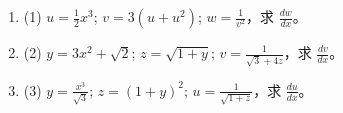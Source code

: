 \documentclass[a4paper,11pt,openany]{ltjsbook}
\begin{document}
\begin{enumerate}
\[
\begin{aligned}
\theta &= 3a^2x^{-\frac{1}{2}}; \\
\omega &= \sqrt{\frac{1-\theta}{1+\theta}}; \\
\phi &= \sqrt{3} - \frac{1}{\sqrt{2}} \omega^{-1}. \\
\end{aligned}
\]
\[
\begin{gathered}
\frac{d\theta}{dx} = -\frac{3a^2}{2\sqrt{x^3}}; \\
\frac{d\omega}{d\theta} = -\frac{1}{(1+\theta)\sqrt{1-\theta^2}}
\end{gathered}
\]
（例5参照、ページ \pageref{examples4}）；そして
\[
\frac{d\phi}{d\omega} = \frac{1}{\sqrt{2}\omega^2}.
\]

したがって \(\dfrac{d\phi}{dx} = \dfrac{1}{\sqrt{2}\,\omega^{2}} \times \dfrac{1}{(1+\theta)\sqrt{1-\theta^{2}}} \times \dfrac{3a^{2}}{2\sqrt{x^{3}}}\)。

次にまず \(\omega\)、その後 \(\theta\) をその値で置き換える。

問題集 VII

あなたは次の問題を成功裏に解くことができます。（解答はページ \pageref[page]{AnsEx:VII} を参照してください。）

\item (1) \( u = \frac{1}{2}x^3 \); \( v = 3(u+u^2) \); \( w = \frac{1}{v^2} \)，求 \(\frac{dw}{dx}\)。

\item (2) \( y = 3x^2 + \sqrt{2} \); \( z = \sqrt{1+y} \); \( v = \frac{1}{\sqrt{3}+4z} \)，求 \(\frac{dv}{dx}\)。

\item (3) \( y = \frac{x^3}{\sqrt{3}} \); \( z = (1+y)^2 \); \( u = \frac{1}{\sqrt{1+z}} \)，求 \(\frac{du}{dx}\)。

\end{enumerate}
\end{document}
